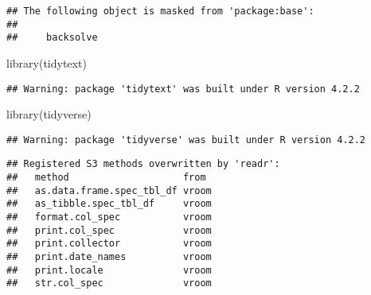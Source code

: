 \documentclass[
]{article}
\newenvironment{Shaded}{\begin{snugshade}}{\end{snugshade}}
\newcommand{\FunctionTok}[1]{\textcolor[rgb]{0.00,0.00,0.00}{#1}}
\newcommand{\NormalTok}[1]{#1}
\begin{document}
\begin{verbatim}
## The following object is masked from 'package:base':
## 
##     backsolve
\end{verbatim}

\begin{Shaded}
\begin{Highlighting}[]
\FunctionTok{library}\NormalTok{(tidytext)}
\end{Highlighting}
\end{Shaded}

\begin{verbatim}
## Warning: package 'tidytext' was built under R version 4.2.2
\end{verbatim}

\begin{Shaded}
\begin{Highlighting}[]
\FunctionTok{library}\NormalTok{(tidyverse)}
\end{Highlighting}
\end{Shaded}

\begin{verbatim}
## Warning: package 'tidyverse' was built under R version 4.2.2
\end{verbatim}

\begin{verbatim}
## Registered S3 methods overwritten by 'readr':
##   method                    from 
##   as.data.frame.spec_tbl_df vroom
##   as_tibble.spec_tbl_df     vroom
##   format.col_spec           vroom
##   print.col_spec            vroom
##   print.collector           vroom
##   print.date_names          vroom
##   print.locale              vroom
##   str.col_spec              vroom
\end{verbatim}
\end{document}
